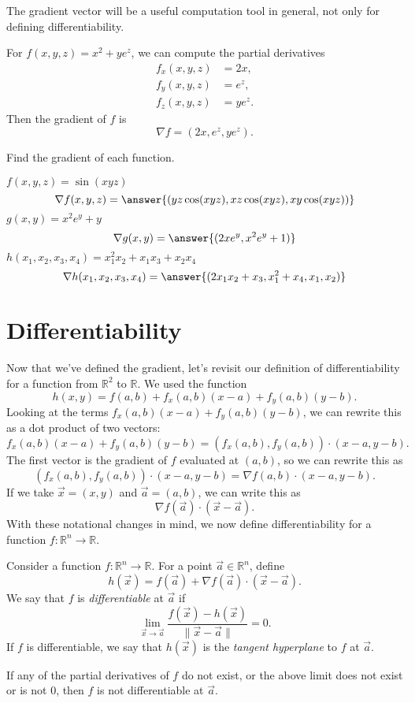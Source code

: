 \documentclass{ximera}
\begin{document}
The gradient vector will be a useful computation tool in general, not only for defining differentiability.

\begin{example}
For $f(x,y,z) = x^2+ye^z$, we can compute the partial derivatives
\begin{align*}
f_x(x,y,z) &= 2x,\\
f_y(x,y,z) &= e^z,\\
f_z(x,y,z) &= ye^z. 
\end{align*} 
Then the gradient of $f$ is
\[
\nabla f = (2x, e^z, ye^z).
\]
\end{example}

\begin{problem}
Find the gradient of each function.

$f(x,y,z) = \sin(xyz)$
\[
\nabla f(x,y,z) = \answer{(yz\cos(xyz), xz\cos(xyz),xy\cos(xyz))}
\]
$g(x,y) = x^2e^y + y$
\[
\nabla g(x,y) = \answer{(2xe^y, x^2e^y+1)}
\]
$h(x_1,x_2,x_3,x_4) = x_1^2x_2+x_1x_3+x_2x_4$
\[
\nabla h(x_1,x_2,x_3,x_4) = \answer{(2x_1x_2+x_3,x_1^2+x_4,x_1,x_2)}
\]
\end{problem}

\section*{Differentiability}

Now that we've defined the gradient, let's revisit our definition of differentiability for a function from $\mathbb{R}^2$ to $\mathbb{R}$. We used the function
\[
h(x,y) = f(a,b) + f_x(a,b)(x-a)+f_y(a,b)(y-b).
\]
Looking at the terms $f_x(a,b)(x-a)+f_y(a,b)(y-b)$, we can rewrite this as a dot product of two vectors:
\[
f_x(a,b)(x-a)+f_y(a,b)(y-b) = (f_x(a,b), f_y(a,b))\cdot (x-a,y-b).
\]
The first vector is the gradient of $f$ evaluated at $(a,b)$, so we can rewrite this as
\[
(f_x(a,b), f_y(a,b))\cdot (x-a,y-b) = \nabla f(a,b)\cdot (x-a,y-b).
\]
If we take $\vec{x}=(x,y)$ and $\vec{a} = (a,b)$, we can write this as
\[
\nabla f(\vec{a})\cdot (\vec{x}-\vec{a}).
\]
With these notational changes in mind, we now define differentiability for a function $f:\mathbb{R}^n\rightarrow\mathbb{R}$.

\begin{definition}
Consider a function $f:\mathbb{R}^n\rightarrow\mathbb{R}$. For a point $\vec{a}\in\mathbb{R}^n$, define
\[
h(\vec{x}) = f(\vec{a})+\nabla f(\vec{a})\cdot (\vec{x}-\vec{a}).
\]
We say that $f$ is \emph{differentiable} at $\vec{a}$ if
\[
\lim_{\vec{x}\rightarrow \vec{a}}\frac{f(\vec{x}) - h(\vec{x})}{\|\vec{x}-\vec{a}\|} = 0.
\]
If $f$ is differentiable, we say that $h(\vec{x})$ is the \emph{tangent hyperplane} to $f$ at $\vec{a}$.

If any of the partial derivatives of $f$ do not exist, or the above limit does not exist or is not $0$, then $f$ is not differentiable at $\vec{a}$.
\end{definition}
\end{document}
